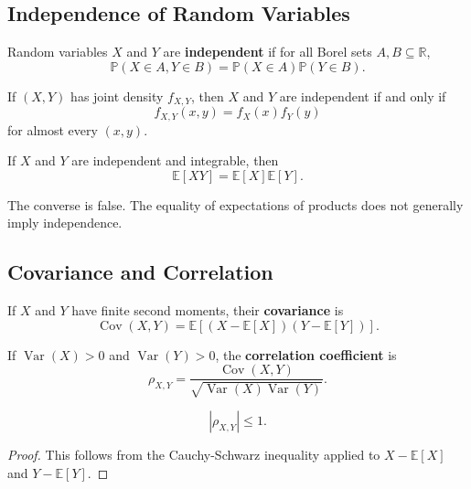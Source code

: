 \subsection{Independence of Random Variables}

\begin{definition}
Random variables $X$ and $Y$ are \textbf{independent} if for all Borel sets $A,B\subseteq\mathbb{R}$,
\[
    \mathbb{P}(X\in A,Y\in B)=\mathbb{P}(X\in A)\mathbb{P}(Y\in B).
\]
\end{definition}

\begin{proposition}
If $(X,Y)$ has joint density $f_{X,Y}$, then $X$ and $Y$ are independent if and only if
\[
    f_{X,Y}(x,y)=f_X(x)f_Y(y)
\]
for almost every $(x,y)$.
\end{proposition}

\begin{proposition}
If $X$ and $Y$ are independent and integrable, then
\[
    \mathbb{E}[XY]=\mathbb{E}[X]\mathbb{E}[Y].
\]
\end{proposition}

\begin{remark}
The converse is false. The equality of expectations of products does not generally imply independence.
\end{remark}

\subsection{Covariance and Correlation}

\begin{definition}[Covariance]
If $X$ and $Y$ have finite second moments, their \textbf{covariance} is
\[
    \operatorname{Cov}(X,Y)=\mathbb{E}[(X-\mathbb{E}[X])(Y-\mathbb{E}[Y])].
\]
\end{definition}

\begin{definition}[Correlation]
If $\operatorname{Var}(X)>0$ and $\operatorname{Var}(Y)>0$, the \textbf{correlation coefficient} is
\[
    \rho_{X,Y}=\frac{\operatorname{Cov}(X,Y)}{\sqrt{\operatorname{Var}(X)\operatorname{Var}(Y)}}.
\]
\end{definition}

\begin{proposition}
\[
    |\rho_{X,Y}|\leq 1.
\]
\end{proposition}

\begin{proof}
This follows from the Cauchy-Schwarz inequality applied to $X-\mathbb{E}[X]$ and $Y-\mathbb{E}[Y]$.
\end{proof}

